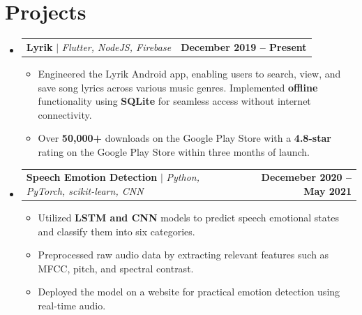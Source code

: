 \documentclass[letterpaper,11pt]{article}
\makeatletter
\newcommand{\resumeItem}[1]{
  \item\small{
    {#1 \vspace{-2pt}}
  }
}
\newcommand{\resumeProjectHeading}[2]{
    \item
    \begin{tabular*}{0.97\textwidth}{l@{\extracolsep{\fill}}r}
        \small#1 & \textbf{#2} \\
    \end{tabular*}\vspace{-7pt}
}
\newcommand{\resumeSubHeadingListStart}{\begin{itemize}[leftmargin=0.15in, label={}]}
\newcommand{\resumeSubHeadingListEnd}{\end{itemize}}
\newcommand{\resumeItemListStart}{\begin{itemize}}
\newcommand{\resumeItemListEnd}{\end{itemize}\vspace{-5pt}}
\makeatother
\begin{document}
\section{Projects}
    \resumeSubHeadingListStart
    \resumeProjectHeading
    {\textbf{Lyrik} $|$ \emph{Flutter, NodeJS, Firebase}}
  {December 2019 -- Present}
          \resumeItemListStart
          \resumeItem{Engineered the Lyrik Android app, enabling users to search, view, and save song lyrics across various music genres. Implemented \textbf{offline} functionality using \textbf{SQLite} for seamless access without internet connectivity.}
            \resumeItem{
                Over \textbf{50,000+} downloads on the Google Play Store with a \textbf{4.8-star} rating on the Google Play Store within three months of launch.	
}
          \resumeItemListEnd
      \resumeProjectHeading
          {\textbf{Speech Emotion Detection} $|$ \emph{Python, PyTorch, scikit-learn, CNN}}{Decemeber 2020 -- May 2021}
          \resumeItemListStart
          \resumeItem{Utilized \textbf{LSTM and CNN} models to predict speech emotional states and classify them into six categories.}
            \resumeItem{Preprocessed raw audio data by extracting relevant features such as MFCC, pitch, and spectral contrast.}
            \resumeItem{Deployed the model on a website for practical emotion detection using real-time audio.}
          \resumeItemListEnd
    \resumeSubHeadingListEnd






\end{document}
